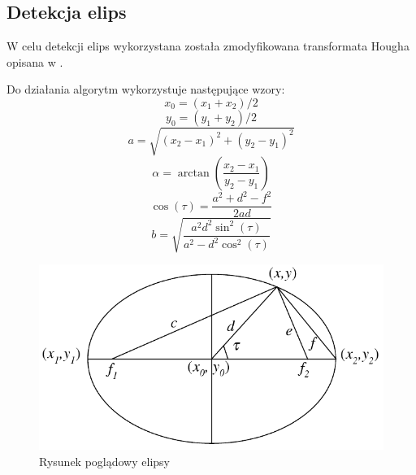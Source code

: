 \documentclass{classrep}
\begin{document}
\subsection{Detekcja elips}
W celu detekcji elips wykorzystana została zmodyfikowana transformata Hougha opisana w \cite{hough}. 

Do działania algorytm wykorzystuje następujące wzory:
\begin{equation}
\label{eq:x0}
 x_0 = (x_1 + x_2) / 2
\end{equation}
\begin{equation}
\label{eq:y0}
 y_0 = (y_1 + y_2) / 2
\end{equation}
\begin{equation}
\label{eq:a}
 a = \sqrt{(x_2 - x_1)^2 + (y_2 - y_1)^2}
\end{equation}
\begin{equation}
\label{eq:alfa}
 \alpha = \arctan{\left(\frac{x_2 - x_1}{y_2 - y_1}\right)}
\end{equation}
\begin{equation}
\label{eq:costau}
 \cos(\tau) = \frac{a^2 + d^2 - f^2}{2ad}
\end{equation}
\begin{equation}
\label{eq:b}
 b = \sqrt{\frac{a^2 d^2 \sin^2(\tau)}{a^2 - d^2\cos^2(\tau)}}
\end{equation}

\begin{figure}
  \centering
  \includegraphics[width=\textwidth]{gfx/ellipse.png}
  \caption{Rysunek poglądowy elipsy}
  \label{fig:ellipse}
\end{figure}
\end{document}
